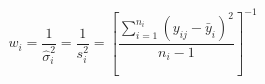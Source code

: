 

\[
w_i = \frac{1}{\hat{\sigma}^2_i} = \frac{1}{s^2_i} = 
      [\frac{\sum_{i=1}^{n_i}(y_{ij}-\bar{y}_i)^2}{n_i-1}]^{-1}

\]


